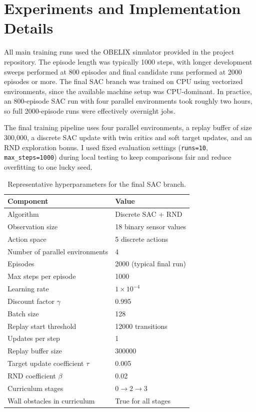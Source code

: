 \documentclass[11pt,oneside]{article}
\begin{document}
\section{Experiments and Implementation Details}
All main training runs used the OBELIX simulator provided in the project repository. The episode length was typically 1000 steps, with longer development sweeps performed at 800 episodes and final candidate runs performed at 2000 episodes or more. The final SAC branch was trained on CPU using vectorized environments, since the available machine setup was CPU-dominant. In practice, an 800-episode SAC run with four parallel environments took roughly two hours, so full 2000-episode runs were effectively overnight jobs.

The final training pipeline uses four parallel environments, a replay buffer of size 300,000, a discrete SAC update with twin critics and soft target updates, and an RND exploration bonus. I used fixed evaluation settings (\texttt{runs=10}, \texttt{max\_steps=1000}) during local testing to keep comparisons fair and reduce overfitting to one lucky seed.

\begin{table}[h]
\centering
\small
\caption{Representative hyperparameters for the final SAC branch.}
\begin{tabular}{ll}
\toprule
Component & Value \\
\midrule
Algorithm & Discrete SAC + RND \\
Observation size & 18 binary sensor values \\
Action space & 5 discrete actions \\
Number of parallel environments & 4 \\
Episodes & 2000 (typical final run) \\
Max steps per episode & 1000 \\
Learning rate & $1 \times 10^{-4}$ \\
Discount factor $\gamma$ & 0.995 \\
Batch size & 128 \\
Replay start threshold & 12000 transitions \\
Updates per step & 1 \\
Replay buffer size & 300000 \\
Target update coefficient $\tau$ & 0.005 \\
RND coefficient $\beta$ & 0.02 \\
Curriculum stages & $0 \rightarrow 2 \rightarrow 3$ \\
Wall obstacles in curriculum & True for all stages \\
\bottomrule
\end{tabular}
\end{table}
\end{document}

